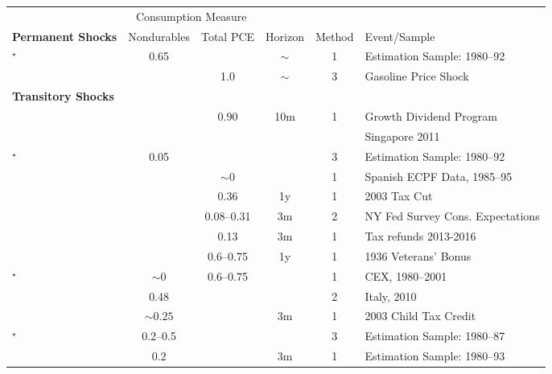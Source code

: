 \begin{tabular}{p{8cm}ccccl}
\toprule
&  \multicolumn{2}{c}{Consumption Measure}&&&\\
\cmidrule(r){2-3}
\textbf{Permanent Shocks} & \multicolumn{1}{c}{Nondurables} & \multicolumn{1}{c}{Total PCE}& Horizon & Method & Event/Sample \\
\midrule
\citet{blundell_consumption_2008}$^\star$ & 0.65& & $\sim$ & 1  & Estimation Sample: 1980--92\\
\citet{gelman_response_2016} &  & 1.0 & $\sim$ & 3  & Gasoline Price Shock \\
\textbf{Transitory Shocks} \\
\midrule
\citet{agarwal_consumption_2014} &  & 0.90 & 10m & 1 & Growth Dividend Program \\
 & & & & & Singapore 2011\\
\citet{blundell_consumption_2008}$^\star$ & 0.05& & & 3  & Estimation Sample: 1980--92\\
\citet{browningCollado:AntIncChanges} &  & \multicolumn{1}{c}{$\sim0$} && 1& Spanish ECPF Data, 1985--95\\
\citet{coronadoEtAl} & & \multicolumn{1}{c}{0.36} & 1y & 1 &2003 Tax Cut\\
\citet{fuster_what_2018} & & \multicolumn{1}{c}{0.08--0.31}   & 3m & 2 & NY Fed Survey Cons. Expectations\\
\citet{gelman_what_2016} & &\multicolumn{1}{c}{0.13}   & 3m & 1 & Tax refunds 2013-2016\\
\citet{hausmanVeteransBonus} & &   \multicolumn{1}{c}{0.6--0.75} & 1y & 1 & 1936 Veterans' Bonus\\
\citet{hsieh:alaska}$^\star$ & \multicolumn{1}{c}{$\sim0$}  &  \multicolumn{1}{c}{0.6--0.75} & & 1  & CEX, 1980--2001\\
\citet{jappelli_fiscal_2014} & \multicolumn{1}{c}{0.48} & & & 2  & Italy, 2010 \\
\citet{johnsonEtAl:2003childTaxCredit} & \multicolumn{1}{c}{$\sim0.25$} &  & 3m & 1  & 2003 Child Tax Credit \\
\citet{lusardi}$^\star$ & \multicolumn{1}{c}{0.2--0.5} & & & 3  & Estimation Sample: 1980--87\\
\citet{parkerSocSec} & 0.2 &  & 3m & 1  & Estimation Sample: 1980--93\\

\end{tabular}

